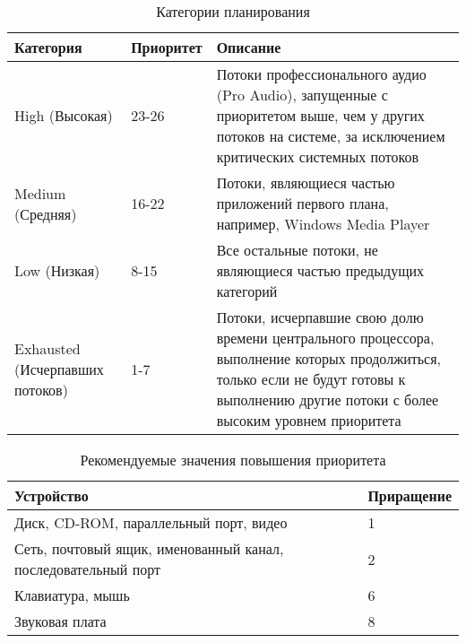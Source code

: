 \begin{table}[!h]
	\caption{Категории планирования}
	\begin{center}
		\begin{tabular}{|p{40mm}|p{30mm}|p{80mm}|}
			\hline
			\textbf{Категория} & \textbf{Приоритет} & \textbf{Описание} \\
			\hline
			High (Высокая) & 23-26 & Потоки профессионального аудио (Pro
			Audio), запущенные с приоритетом выше, чем у других потоков на системе, за
			исключением критических системных потоков \\
			\hline
			Medium (Средняя) & 16-22 & Потоки, являющиеся частью приложений
			первого плана, например, Windows Media Player \\
			\hline
			Low (Низкая) & 8-15 & Все остальные потоки, не являющиеся частью
			предыдущих категорий \\
			\hline
			Exhausted (Исчерпавших потоков) & 1-7 & Потоки, исчерпавшие свою
			долю времени центрального процессора, выполнение которых продолжиться, только
			если не будут готовы к выполнению другие потоки с более высоким уровнем
			приоритета \\
			\hline
		\end{tabular}
	\end{center}
	\label{tab:category}
\end{table}

\begin{table}[!h]
	\caption{Рекомендуемые значения повышения приоритета}
	\begin{center}
		\begin{tabular}{|p{100mm}|l|}
			\hline
			\textbf{Устройство} & \textbf{Приращение} \\\hline
			Диск, CD-ROM, параллельный порт, видео & 1 \\ \hline
			Сеть, почтовый ящик, именованный канал, последовательный порт & 2 \\ \hline
			Клавиатура, мышь & 6 \\ \hline
			Звуковая плата & 8 \\ \hline
		\end{tabular}
	\end{center}
	\label{tab:input-output}
\end{table}